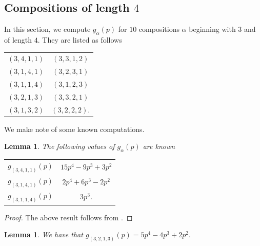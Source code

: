 \documentclass[a4paper]{amsart}
\newtheorem{lemma}[theorem]{Lemma}
\numberwithin{equation}{section}
\theoremstyle{remark}
\begin{document}
\subsection{Compositions of length $4$} 
\noindent In this section, we compute $g_{\alpha}(p)$ for $10$ compositions $\alpha$ beginning with $3$ and of length $4$. They are listed as follows
\begin{table}[H]
\centering
 \begin{tabular}{c c } 
 \hline
 $(3,4,1,1)$ & $(3,3,1,2)$\\ 
 $(3,1,4,1)$ & $(3,2,3,1)$\\
 $(3,1,1,4)$ & $(3,1,2,3)$\\
 $(3,2,1,3)$ & $(3,3,2,1)$ \\
 $(3,1,3,2)$ & $(3,2,2,2)$.\\
\hline
\end{tabular}
\end{table}
We make note of some known computations.
\begin{lemma}
The following values of $g_\alpha(p)$ are known
\begin{table}[H]
\centering
 \begin{tabular}{c c } 
 \hline
 $g_{(3,4,1,1)}(p)$ & $15p^4-9p^3+3p^2$\\ 
 $g_{(3,1,4,1)}(p)$ & $2p^4+6p^3-2p^2$\\
 $g_{(3,1,1,4)}(p)$ & $3p^3$.\\
\hline
\end{tabular}
\end{table}
\end{lemma}
\begin{proof}
The above result follows from \cite[Lemma 4.6]{isham2022number}.
\end{proof}
\begin{lemma}\label{(3,2,1,3)}
We have that $g_{(3,2,1,3)}(p) = 5p^4-4p^3+2p^2.$
\end{lemma}
\end{document}
